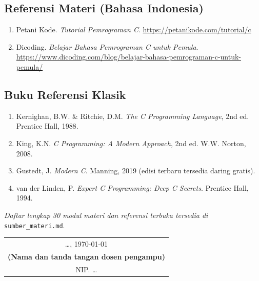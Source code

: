 \documentclass[12pt,a4paper]{article}
\begin{document}
\subsection*{Referensi Materi (Bahasa Indonesia)}

\begin{enumerate}[leftmargin=*,resume]
  \item Petani Kode. \textit{Tutorial Pemrograman C}. \url{https://petanikode.com/tutorial/c}

  \item Dicoding. \textit{Belajar Bahasa Pemrograman C untuk Pemula}. \url{https://www.dicoding.com/blog/belajar-bahasa-pemrograman-c-untuk-pemula/}
\end{enumerate}

\subsection*{Buku Referensi Klasik}

\begin{enumerate}[leftmargin=*,resume]
  \item Kernighan, B.W. \& Ritchie, D.M. \textit{The C Programming Language}, 2nd ed. Prentice Hall, 1988.

  \item King, K.N. \textit{C Programming: A Modern Approach}, 2nd ed. W.W. Norton, 2008.

  \item Gustedt, J. \textit{Modern C}. Manning, 2019 (edisi terbaru tersedia daring gratis).

  \item van der Linden, P. \textit{Expert C Programming: Deep C Secrets}. Prentice Hall, 1994.
\end{enumerate}

\vspace{0.5cm}
\noindent\textit{Daftar lengkap 30 modul materi dan referensi terbuka tersedia di} \texttt{sumber\_materi.md}.

\vspace{1cm}

\begin{flushright}
\begin{tabular}{c}
\ldots, \today \\[2cm]
\textbf{(Nama dan tanda tangan dosen pengampu)}\\
NIP. \ldots
\end{tabular}
\end{flushright}
\end{document}
